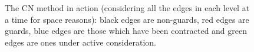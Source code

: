 \documentclass[preprint,a4paper]{elsarticle}
\newenvironment{stusubfig}[1]
{
	\begin{figure}[#1]
	\begin{center}
}
{
	\end{center}
	\end{figure}
}
\begin{document}
\begin{stusubfig}{p}
	\hspace{4mm}%
	\hspace{4mm}%
\caption[The CN method in action]{The CN method in action (considering all the edges in each level at a time for space reasons): black edges are non-guards, red edges are guards, blue edges are those which have been contracted and green edges are ones under active consideration.}
\label{fig:segmentation-waterfall-nicholls-example}
\end{stusubfig}
\end{document}
